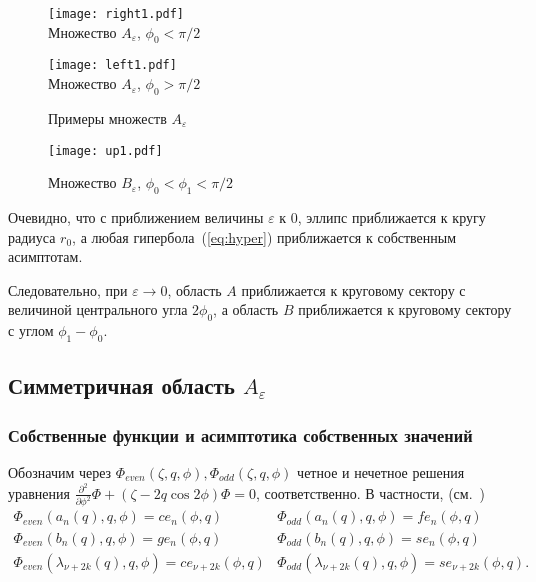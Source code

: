 \begin{figure}[ht]
    \begin{minipage}[b][][b]{0.49\linewidth}\centering
        \texttt{[image: right1.pdf]} \\ 
        Множество $A_\varepsilon$, $\phi_0<\pi/2$
    \end{minipage}
    \hfill
    \begin{minipage}[b][][b]{0.49\linewidth}\centering
        \texttt{[image: left1.pdf]} \\ 
        Множество $A_\varepsilon$, $\phi_0>\pi/2$
    \end{minipage}
\caption{Примеры множеств $A_\varepsilon$}
\end{figure}

\begin{figure}[ht]
\begin{minipage}{0.9\linewidth}\centering
        \texttt{[image: up1.pdf]}  
    \end{minipage}
\caption{        Множество $B_\varepsilon$, $\phi_0<\phi_1<\pi/2$}
\end{figure}

Очевидно, что с приближением величины $\varepsilon$ к 0, эллипс приближается к кругу радиуса $r_0$,
а любая гипербола~(\ref{eq:hyper}) приближается к собственным асимптотам.

Следовательно, при $\varepsilon\to 0$, область $A$ приближается к круговому сектору с величиной центрального угла $2\phi_0$, 
а область  $B$ приближается к круговому сектору с углом $\phi_1-\phi_0$. 


\subsection{Симметричная область $A_\varepsilon$}\label{sec:ch2/sec2/sub1}
\subsubsection{Собственные функции и асимптотика собственных значений}\label{sec:ch2/sec2/sub1/sub1}

Обозначим через $\Phi_{even}(\zeta, q, \phi), \Phi_{odd}(\zeta, q, \phi)$ четное и нечетное решения уравнения $\frac{\partial^2}{\partial \phi^2}\Phi + (\zeta - 2q\cos{2\phi})\Phi = 0$, соответственно. 
В частности, (см.~\cite{wref2})
\[
\begin{array}{ll}
    \Phi_{even}(a_n(q), q, \phi) = ce_n(\phi, q)	&
    \Phi_{odd}(a_n(q), q, \phi) = fe_n(\phi, q)\\
    \Phi_{even}(b_n(q), q, \phi) = ge_n(\phi, q)	&
    \Phi_{odd}(b_n(q), q, \phi) = se_n(\phi, q)\\
    \Phi_{even}(\lambda_{\nu+2k}(q), q, \phi) = ce_{\nu+2k}(\phi, q) 	&
    \Phi_{odd}(\lambda_{\nu+2k}(q), q, \phi) = se_{\nu+2k}(\phi, q).
\end{array}
\]

